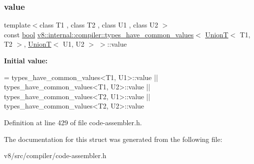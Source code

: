 \subsubsection{\texorpdfstring{value}{value}}
{\footnotesize\ttfamily template$<$class T1 , class T2 , class U1 , class U2 $>$ \\
const \mbox{\hyperlink{classbool}{bool}} \mbox{\hyperlink{structv8_1_1internal_1_1compiler_1_1types__have__common__values}{v8\+::internal\+::compiler\+::types\+\_\+have\+\_\+common\+\_\+values}}$<$ \mbox{\hyperlink{structv8_1_1internal_1_1UnionT}{UnionT}}$<$ T1, T2 $>$, \mbox{\hyperlink{structv8_1_1internal_1_1UnionT}{UnionT}}$<$ U1, U2 $>$ $>$\+::value\hspace{0.3cm}{\ttfamily [static]}}

{\bfseries Initial value\+:}
\begin{DoxyCode}
= types\_have\_common\_values<T1, U1>::value ||
                            types\_have\_common\_values<T1, U2>::value ||
                            types\_have\_common\_values<T2, U1>::value ||
                            types\_have\_common\_values<T2, U2>::value
\end{DoxyCode}


Definition at line 429 of file code-\/assembler.\+h.



The documentation for this struct was generated from the following file\+:\begin{DoxyCompactItemize}
\item 
v8/src/compiler/code-\/assembler.\+h\end{DoxyCompactItemize}
